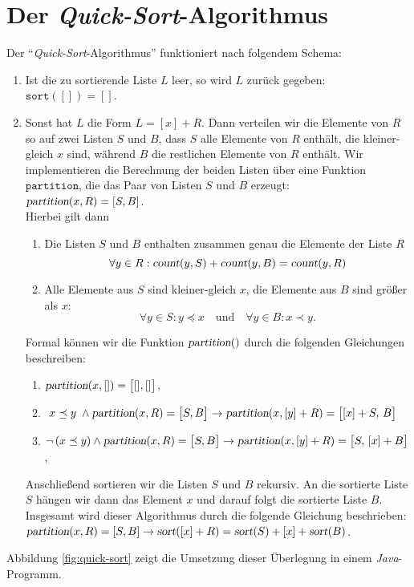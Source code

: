 \section{Der \emph{Quick-Sort}-Algorithmus}
Der ``\emph{Quick-Sort}-Algorithmus'' funktioniert nach folgendem Schema:
\begin{enumerate}
\item Ist die zu sortierende Liste $L$ leer, so wird $L$
      zur\"uck gegeben: \\[0.1cm]
      \hspace*{1.3cm} $\mathtt{sort}([]) = []$.
\item Sonst hat $L$ die Form $L = [x] + R$.
      Dann verteilen wir die Elemente von $R$ so auf zwei Listen $S$ und $B$, 
      dass $S$ alle Elemente von $R$ enth\"alt, die kleiner-gleich $x$ sind, w\"ahrend $B$ die
      restlichen Elemente von $R$ enth\"alt. 
      Wir implementieren die Berechnung der beiden Listen \"uber eine Funktion
      $\mathtt{partition}$, die das Paar von Listen $S$ und $B$ erzeugt: 
      \\[0.2cm]
      \hspace*{1.3cm}
      $\textsl{partition}(x,R) = [S,B]$.
      \\[0.2cm]
      Hierbei gilt dann 
      \begin{enumerate}
      \item Die Listen $S$ und $B$ enthalten zusammen genau die Elemente der Liste $R$
            \[ \forall y \in R: \textsl{count}(y,S) + \textsl{count}(y,B) = \textsl{count}(y,R) \]
      \item Alle Elemente aus $S$ sind kleiner-gleich $x$, die Elemente aus $B$ sind
            gr\"o{\ss}er als $x$:
            \[ \forall y \in S: y \preceq x \quad \mbox{und} \quad \forall y \in B: x \prec y. \]
      \end{enumerate}
      Formal k\"onnen wir die Funktion $\textsl{partition}()$ durch die folgenden
      Gleichungen beschreiben:
      \begin{enumerate}
      \item $\textsl{partition}(x, []) = \bigl[[], []\bigr]$,
      \item \quad $\; x \preceq y\; \wedge \textsl{partition}(x,R) = \bigl[ S, B \bigr] \rightarrow 
             \textsl{partition}(x, [y] + R) = \bigl[ [x] + S,\, B \bigr]$
      \item $\neg\, (x \preceq y) \wedge \textsl{partition}(x,R) = \bigl[ S, B \bigr] \rightarrow 
             \textsl{partition}(x, [y] + R) = \bigl[ S,\, [x] + B \bigr]$,
      \end{enumerate}
      Anschlie{\ss}end sortieren wir die Listen $S$ und $B$ rekursiv.
      An die sortierte Liste $S$ h\"angen wir dann das Element $x$ und darauf folgt die
      sortierte Liste $B$.  Insgesamt wird dieser Algorithmus durch die folgende Gleichung
      beschrieben:
      \\[0.2cm]
      \hspace*{1.3cm}
      $\textsl{partition}(x,R) = [S,B] \rightarrow 
       \textsl{sort}([x] + R) = \textsl{sort}(S) + [x] + \textsl{sort}(B)$.
\end{enumerate}
Abbildung \ref{fig:quick-sort} zeigt die Umsetzung dieser Überlegung 
in einem \textsl{Java}-Programm.

